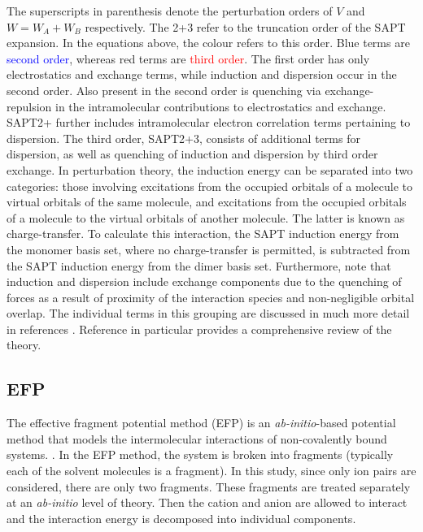 The superscripts in parenthesis denote the perturbation orders of $V$ and $W = W_A + W_B$ respectively. 
The 2+3 refer to the truncation order of the SAPT expansion.
In the equations above, the colour refers to this order. 
Blue terms are \textcolor{blue}{second order}, whereas red terms are \textcolor{red}{third order}.
The first order has only electrostatics and exchange terms, while induction and dispersion occur in the second order.
Also present in the second order is quenching via exchange-repulsion in the intramolecular contributions to electrostatics and exchange.
SAPT2+ further includes intramolecular electron correlation terms pertaining to dispersion.
The third order, SAPT2+3, consists of additional terms for dispersion, as well as quenching of induction and dispersion by third order exchange.
In perturbation theory, the induction energy can be separated into two categories: those involving excitations from the occupied orbitals of a molecule to virtual orbitals of the same molecule, and excitations from the occupied orbitals of a molecule to the virtual orbitals of another molecule.
\cite{Stone2009a}
The latter is known as charge-transfer.
To calculate this interaction, the SAPT induction energy from the monomer basis set, where no charge-transfer is permitted, is subtracted from the SAPT induction energy from the dimer basis set.
Furthermore, note that induction and dispersion include exchange components due to the quenching of forces as a result of proximity of the interaction species and non-negligible orbital overlap.
The individual terms in this grouping are discussed in much more detail in references
.
Reference  in particular provides a comprehensive review of the theory.


\subsection{EFP}
The effective fragment potential method (EFP) is an \emph{ab-initio}-based potential method that models the intermolecular interactions of non-covalently bound systems.
\cite{Gordon2001a, Gordon2007a, Gordon2009a, Mullin2009a, Ghosh2010a}.
In the EFP method, the system is broken into fragments (typically each of the solvent molecules is a fragment). 
In this study, since only ion pairs are considered, there are only two fragments. 
These fragments are treated separately at an \emph{ab-initio} level of theory. 
Then the cation and anion are allowed to interact and the interaction energy is decomposed into individual components.


